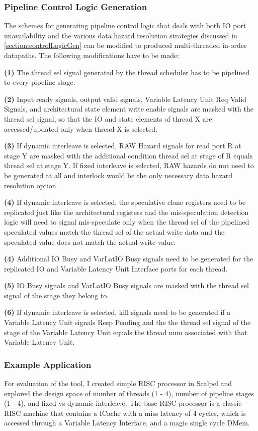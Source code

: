 \subsubsection{Pipeline Control Logic Generation}
The schemes for generating pipeline control logic that deals with both IO port unavailability and the various data hazard resolution strategies discussed in \ref{section:controlLogicGen} can be modified to produced multi-threaded in-order datapaths. The following modifications have to be made:

{\bf (1)} The thread sel signal generated by the thread scheduler has to be pipelined to every pipeline stage.

{\bf (2)} Input ready signals, output valid signals, Variable Latency Unit Req Valid Signals, and architectural state element write enable signals are masked with the thread sel signal, so that the IO and state elements of thread X are accessed/updated only when thread X is selected.

{\bf (3)} If dynamic interleave is selected, RAW Hazard signals for read port R at stage Y are masked with the additional condition thread sel at stage of R equals thread sel at stage Y. If fixed interleave is selected, RAW hazards do not need to be generated at all and interlock would be the only necessary data hazard resolution option.

{\bf (4)} If dynamic interleave is selected, the speculative clone registers need to be replicated just like the architectural registers and the mis-speculation detection logic will need to signal mis-speculate only when the thread sel of the pipelined speculated values match the thread sel of the actual write data and the speculated value does not match the actual write value.

{\bf (4)} Additional IO Busy and VarLatIO Busy signals need to be generated for the replicated IO and Variable Latency Unit Interface ports for each thread.

{\bf (5)} IO Busy signals and VarLatIO Busy signals are masked with the thread sel signal of the stage they belong to.

{\bf (6)} If dynamic interleave is selected, kill signals need to be generated if a Variable Latency Unit signals Resp Pending and the the thread sel signal of the stage of the Variable Latency Unit equals the thread num associated with that Variable Latency Unit.

\subsubsection{Example Application}
For evaluation of the tool, I created simple RISC processor in Scalpel and explored the design space of number of threads (1 - 4), number of pipeline stages (1 - 4), and fixed vs dynamic interleave. The base RISC processor is a classic RISC machine that contains a ICache with a miss latency of 4 cycles, which is accessed through a Variable Latency Interface, and a magic single cycle DMem. 

